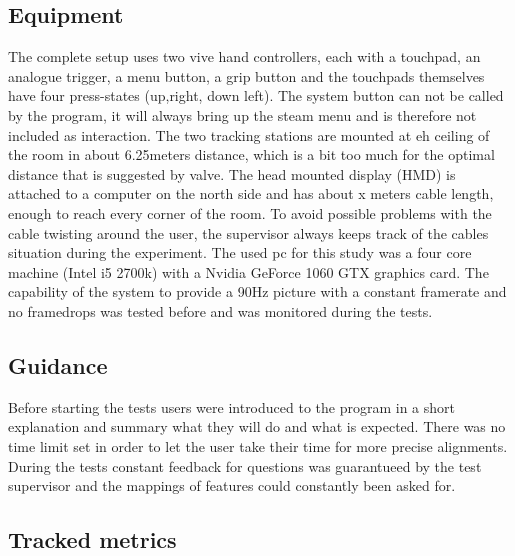\documentclass[hyperref,english,bachelorofscience,bibnum,twoside]{cgvpub}
\begin{document}
\subsection{Equipment}

The complete setup uses two vive hand controllers, each with a touchpad, an analogue trigger, a menu button, a grip button and the touchpads themselves have four press-states (up,right, down left). The system button can not be called by the program, it will always bring up the steam menu and is therefore not included as interaction. The two tracking stations are mounted at eh ceiling of the room in about 6.25meters distance, which is a bit too much for the optimal distance that is suggested by valve. The head mounted display (HMD) is attached to a computer on the north side and has about x meters cable length, enough to reach every corner of the room. To avoid possible problems with the cable twisting around the user, the supervisor always keeps track of the cables situation during the experiment.
The used pc for this study was a four core machine (Intel i5 2700k) with a Nvidia GeForce 1060 GTX graphics card. The capability of the system to provide a 90Hz picture with a constant framerate and no framedrops was tested before and was monitored during the tests.

\subsection{Guidance}

Before starting the tests users were introduced to the program in a short explanation and summary what they will do and what is expected. There was no time limit set in order to let the user take their time for more precise alignments. During the tests constant feedback for questions was guarantueed by the test supervisor and the mappings of features could constantly been asked for.

\subsection{Tracked metrics}
\end{document}
